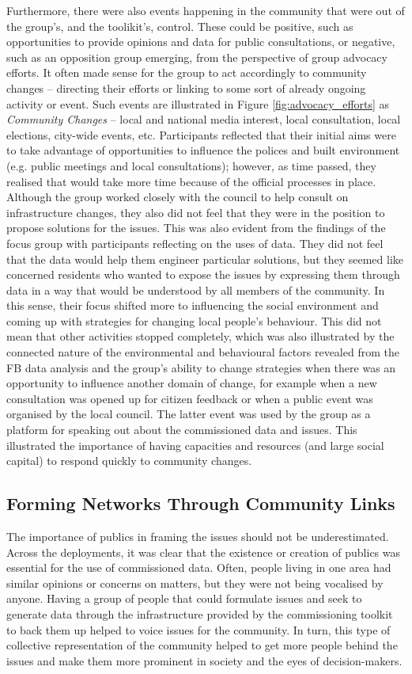 Furthermore, there were also events happening in the community that were out of the group's, and the toolikit's, control. These could be positive, such as opportunities to provide opinions and data for public consultations, or negative, such as an opposition group emerging, from the perspective of group advocacy efforts. It often made sense for the group to act accordingly to community changes -- directing their efforts or linking to some sort of already ongoing activity or event. Such events are illustrated in Figure \ref{fig:advocacy_efforts} as \textit{Community Changes} -- local and national media interest, local consultation, local elections, city-wide events, etc. Participants reflected that their initial aims were to take advantage of opportunities to influence the polices and built environment (e.g. public meetings and local consultations); however, as time passed, they realised that would take more time because of the official processes in place. Although the group worked closely with the council to help consult on infrastructure changes, they also did not feel that they were in the position to propose solutions for the issues. This was also evident from the findings of the focus group with participants reflecting on the uses of data. They did not feel that the data would help them engineer particular solutions, but they seemed like concerned residents who wanted to expose the issues by expressing them through data in a way that would be understood by all members of the community. In this sense, their focus shifted more to influencing the social environment and coming up with strategies for changing local people's behaviour. This did not mean that other activities stopped completely, which was also illustrated by the connected nature of the environmental and behavioural factors revealed from the FB data analysis and the group's ability to change strategies when there was an opportunity to influence another domain of change, for example when a new consultation was opened up for citizen feedback or when a public event was organised by the local council. The latter event was used by the group as a platform for speaking out about the commissioned data and issues. This illustrated the importance of having capacities and resources (and large social capital) to respond quickly to community changes.

\subsection{Forming Networks Through Community Links}
The importance of publics \citep{dewey_public_1954} in framing the issues should not be underestimated. Across the deployments, it was clear that the existence or creation of publics was essential for the use of commissioned data. Often, people living in one area had similar opinions or concerns on matters, but they were not being vocalised by anyone. Having a group of people that could formulate issues and seek to generate data through the infrastructure provided by the commissioning toolkit to back them up helped to voice issues for the community. In turn, this type of collective representation of the community helped to get more people behind the issues and make them more prominent in society and the eyes of decision-makers.

